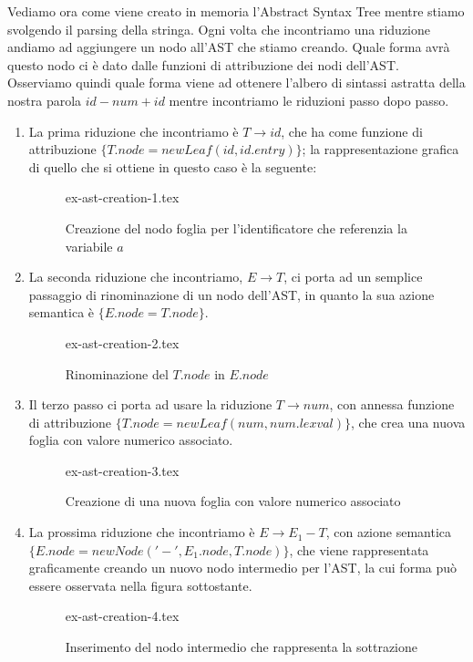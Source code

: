 \documentclass[class=book, crop=false, oneside, 12pt]{standalone}
\begin{document}
Vediamo ora come viene creato in memoria l'Abstract Syntax Tree mentre stiamo svolgendo il parsing della stringa.
Ogni volta che incontriamo una riduzione andiamo ad aggiungere un nodo all'AST che stiamo creando. Quale forma avrà questo nodo ci è dato dalle funzioni di attribuzione dei nodi dell'AST.
Osserviamo quindi quale forma viene ad ottenere l'albero di sintassi astratta della nostra parola \(id-num+id\) mentre incontriamo le riduzioni passo dopo passo.
\begin{enumerate}
    \item La prima riduzione che incontriamo è \(T \to id\), che ha come funzione di attribuzione \(\{T.node = newLeaf(id, id.entry)\}\); la rappresentazione grafica di quello che si ottiene in questo caso è la seguente:
    \begin{figure}[H]
        \centering
        {ex-ast-creation-1.tex}
        \caption{Creazione del nodo foglia per l'identificatore che referenzia la variabile \(a\)}
    \end{figure}
    \item La seconda riduzione che incontriamo, \(E \to T\), ci porta ad un semplice passaggio di rinominazione di un nodo dell'AST, in quanto la sua azione semantica è \(\{E.node = T.node\}\).
    \begin{figure}[H]
        \centering
        {ex-ast-creation-2.tex}
        \caption{Rinominazione del \(T.node\) in \(E.node\)}
    \end{figure} 
    \item Il terzo passo ci porta ad usare la riduzione \(T \to num\), con annessa funzione di attribuzione \(\{T.node = newLeaf(num, num.lexval)\}\), che crea una nuova foglia con valore numerico associato.
    \begin{figure}[H]
        \centering
        {ex-ast-creation-3.tex}
        \caption{Creazione di una nuova foglia con valore numerico associato}
    \end{figure} 
    \item La prossima riduzione che incontriamo è \(E \to E_1 - T\), con azione semantica \(\{E.node = newNode('-', E_1.node, T.node)\}\), che viene rappresentata graficamente creando un nuovo nodo intermedio per l'AST, la cui forma può essere osservata nella figura sottostante.
    \begin{figure}[H]
        \centering
        {ex-ast-creation-4.tex}
        \caption{Inserimento del nodo intermedio che rappresenta la sottrazione}

\end{figure}
\end{enumerate}
\end{document}
